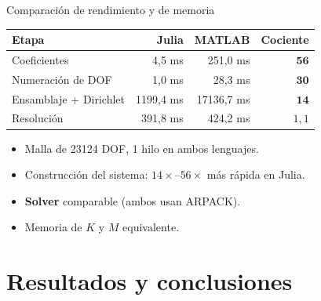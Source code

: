 \documentclass{beamer}
\begin{document}
\begin{frame}{Comparación de rendimiento y de memoria}
  \vspace{-0.35cm}
  \begin{center}
    \footnotesize
    \begin{tabular}{lrrr}
      \hline
      \textbf{Etapa} & \textbf{Julia} & \textbf{MATLAB} & \textbf{Cociente}\\
      \hline
      Coeficientes            & 4{,}5 ms    & 251{,}0 ms   & $\mathbf{56}$\\
      Numeración de DOF       & 1{,}0 ms    & 28{,}3 ms    & $\mathbf{30}$\\
      Ensamblaje + Dirichlet  & 1199{,}4 ms & 17136{,}7 ms & $\mathbf{14}$\\
      Resolución              & 391{,}8 ms  & 424{,}2 ms   & $1{,}1$\\
      \hline
    \end{tabular}
  \end{center}
  \vspace{0.1cm}
  \begin{itemize}\setlength\itemsep{2pt}
    \item Malla de 23124 DOF, 1 hilo en ambos lenguajes.
    \item Construcción del sistema: $14\times$--$56\times$ más rápida en Julia.
    \item \textbf{Solver} comparable (ambos usan ARPACK).
    \item Memoria de $K$ y $M$ equivalente.
  \end{itemize}
\end{frame}

\section{Resultados y conclusiones}

\end{document}
